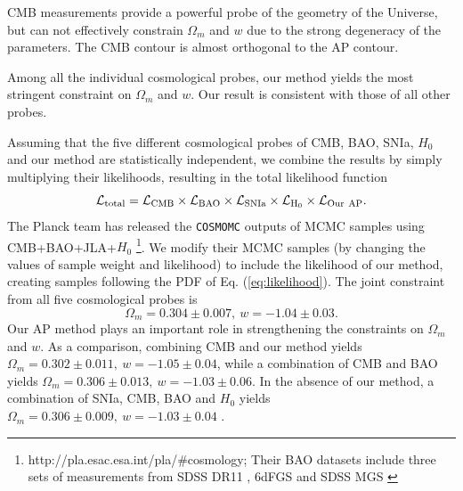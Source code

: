 \documentclass[iop]{emulateapj}
\begin{document}
CMB measurements provide a powerful probe of the geometry of the Universe,
but can not effectively constrain $\Omega_m$ and $w$ due to the strong degeneracy of the parameters.
The CMB contour is almost orthogonal to the AP contour. 

Among all the individual cosmological probes, our method yields the most stringent 
constraint on $\Omega_m$ and $w$.
Our result is consistent with those of all other probes.

Assuming that the five different cosmological probes of CMB, BAO, SNIa, $H_0$ and our method are 
statistically independent,
we combine the results by simply multiplying their likelihoods,
resulting in the total likelihood function
\begin{equation}\label{eq:likelihood}
\mathcal{L}_{\rm total} = \mathcal{L}_{\rm CMB} \times \mathcal{L}_{\rm BAO} \times \mathcal{L}_{\rm SNIa}\times \mathcal{L}_{\rm H_0}
 \times \mathcal{L}_{\rm Our\ AP}.
\end{equation}
The Planck team has released the {\texttt {COSMOMC}} outputs of MCMC samples
using CMB+BAO+JLA+$H_0$
\footnote{http://pla.esac.esa.int/pla/\#cosmology; 
Their BAO datasets include three sets of measurements from SDSS DR11 \citep{Anderson2013}, 6dFGS \citep{6dFGS} and SDSS MGS \citep{MGS}}.
We modify their MCMC samples (by changing the values of sample weight and likelihood)
 to include the likelihood of our method,
creating samples following the PDF of Eq. (\ref{eq:likelihood}).
The joint constraint from all five cosmological probes is
\begin{equation}
 \Omega_m = 0.304 \pm 0.007,\ w=-1.04 \pm 0.03.
\end{equation}
Our AP method plays an important role in strengthening the constraints on $\Omega_m$ and $w$.
As a comparison, combining CMB and our method yields $\Omega_m = 0.302 \pm 0.011,\ w=-1.05 \pm 0.04$,
while a combination of CMB and BAO yields $\Omega_m = 0.306 \pm 0.013,\ w=-1.03 \pm 0.06$.
In the absence of our method, a combination of SNIa, CMB, BAO and $H_0$
yields $\Omega_m = 0.306 \pm 0.009,\ w=-1.03 \pm 0.04$ \citep{Planck2015}.
\end{document}
